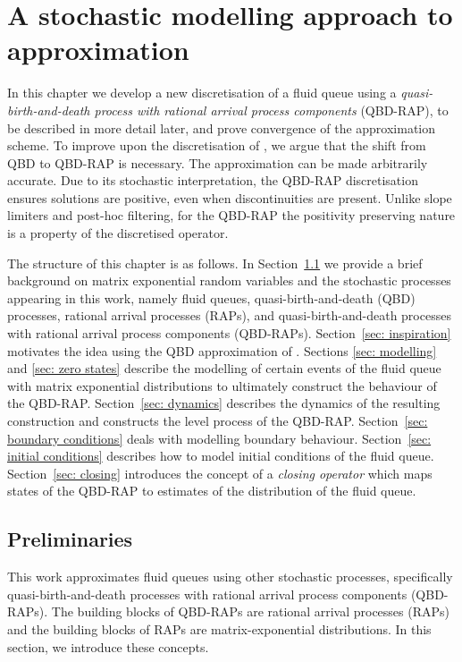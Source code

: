 \chapter{A stochastic modelling approach to approximation\label{sec: construction and modelling}}
In this chapter we develop a new discretisation of a fluid queue using a \emph{quasi-birth-and-death process with rational arrival process components} (QBD-RAP), to be described in more detail later, and prove convergence of the approximation scheme. To improve upon the discretisation of \cite{bo2013}, we argue that the shift from QBD to QBD-RAP is necessary. The approximation can be made arbitrarily accurate. Due to its stochastic interpretation, the QBD-RAP discretisation ensures solutions are positive, even when discontinuities are present. Unlike slope limiters and post-hoc filtering, for the QBD-RAP the positivity preserving nature is a property of the discretised operator. 

The structure of this chapter is as follows. In Section~\ref{sec: prelim} we provide a brief background on matrix exponential random variables and the stochastic processes appearing in this work, namely fluid queues, quasi-birth-and-death (QBD) processes, rational arrival processes (RAPs), and quasi-birth-and-death processes with rational arrival process components (QBD-RAPs). Section~\ref{sec: inspiration} motivates the idea using the QBD approximation of \citep{bo2014}. Sections \ref{sec: modelling} and \ref{sec: zero states} describe the modelling of certain events of the fluid queue with matrix exponential distributions to ultimately construct the behaviour of the QBD-RAP. Section~\ref{sec: dynamics} describes the dynamics of the resulting construction and constructs the level process of the QBD-RAP. Section~\ref{sec: boundary conditions} deals with modelling boundary behaviour. Section~\ref{sec: initial conditions} describes how to model initial conditions of the fluid queue. Section~\ref{sec: closing} introduces the concept of a \emph{closing operator} which maps states of the QBD-RAP to estimates of the distribution of the fluid queue. 


\section{Preliminaries}\label{sec: prelim}
This work approximates fluid queues using other stochastic processes, specifically quasi-birth-and-death processes with rational arrival process components (QBD-RAPs). The building blocks of QBD-RAPs are rational arrival processes (RAPs) and the building blocks of RAPs are matrix-exponential distributions. In this section, we introduce these concepts. 

